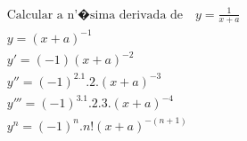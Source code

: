 \begin{ex}
\begin{align}
&\text{Calcular a n'�sima derivada de}\quad y=\frac{1}{x+a}\nonumber\\
&y=(x+a)^{-1}\nonumber\\
&y'=(-1)(x+a)^{-2}\nonumber\\
&y''=(-1)^2.1.2.(x+a)^{-3}\nonumber\\
&y'''=(-1)^3.1.2.3.(x+a)^{-4}\nonumber\\
&y^{n}=(-1)^{n}.n!(x+a)^{-(n+1)}\nonumber
\end{align}
\end{ex}
